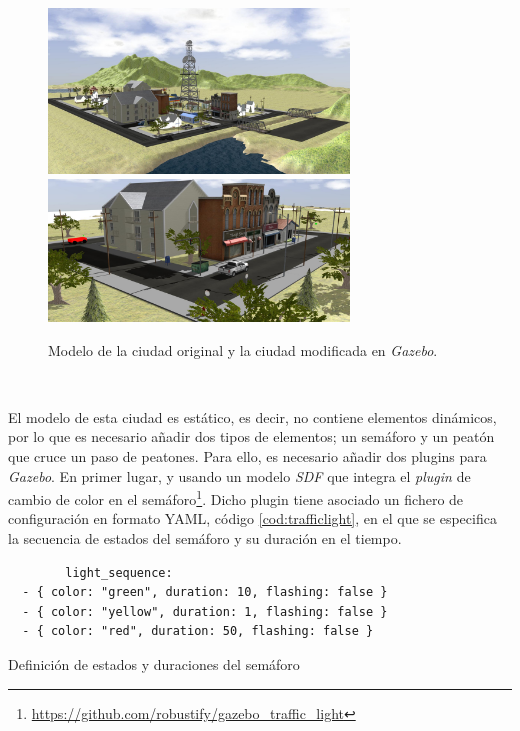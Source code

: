 \begin{figure} [h!]
	\begin{center}
		\includegraphics[width=8cm]{figs/city}\includegraphics[width=8cm]{figs/simulator}
	\end{center}
	\caption{Modelo de la ciudad original y la ciudad modificada en \textit{Gazebo}.}
	\label{fig:city}
\end{figure}\

El modelo de esta ciudad es estático, es decir, no contiene elementos dinámicos, por lo que es necesario añadir dos tipos de elementos; un semáforo y un peatón que cruce un paso de peatones. Para ello, es necesario añadir dos plugins para \textit{Gazebo}. En primer lugar, y usando un modelo \textit{SDF} que integra el \textit{plugin} de cambio de color en el semáforo\footnote{\url{https://github.com/robustify/gazebo_traffic_light}}. Dicho plugin tiene asociado un fichero de configuración en formato YAML, código  \ref{cod:trafficlight}, en el que se especifica la secuencia de estados del semáforo y su duración en el tiempo.\\

\begin{code}[h]
	\begin{lstlisting}
		light_sequence:
  - { color: "green", duration: 10, flashing: false }
  - { color: "yellow", duration: 1, flashing: false }
  - { color: "red", duration: 50, flashing: false }
	\end{lstlisting}
	\caption[Definición de estados y duraciones del semáforo]{Definición de estados y duraciones del semáforo}
	\label{cod:trafficlight}
\end{code}


